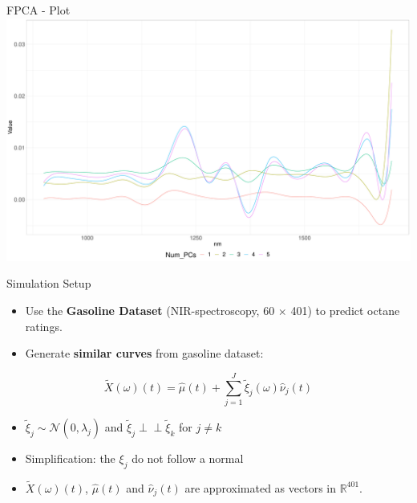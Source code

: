 \documentclass{beamer}
\newcommand{\independent}{\perp\!\!\!\!\perp}
\begin{document}
	\begin{frame}{FPCA - Plot}
			\includegraphics[width = \textwidth]{../Graphics/pc_approx.pdf}
	\end{frame}
	

	\begin{frame}{Simulation Setup}
		\begin{itemize}
			\item Use the \textbf{Gasoline Dataset} (NIR-spectroscopy, 60 $\times$ 401) to predict octane ratings.
			\item Generate \textbf{similar curves} from gasoline dataset:
		\end{itemize}
	
		$$\tilde{X}(\omega)(t) = \hat{\mu}(t) + \sum_{j = 1}^{J} \tilde{\xi}_j(\omega) \hat{\nu}_j(t)$$ 

		\begin{itemize}
			\item $\tilde{\xi}_{j} \sim \mathcal{N}(0,\hat{\lambda}_j)$ and $\tilde{\xi}_{j} \independent \tilde{\xi}_{k}$ for $j \neq k$
			\item Simplification: the $\xi_{j}$ do not follow a normal
			\item $\tilde{X}(\omega)(t)$, $\hat{\mu}(t)$ and $\hat{\nu}_j(t)$ are approximated as vectors in $\mathbb{R}^{401}$.
		\end{itemize}
		
	\end{frame}
	
\end{document}
